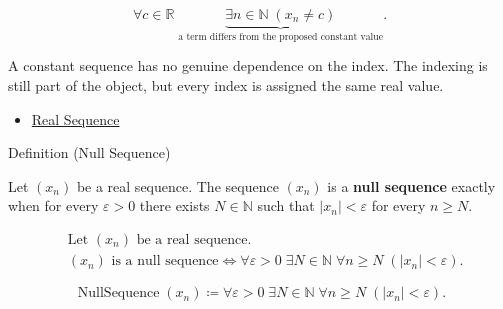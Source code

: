 \begin{remark*}
\[
\forall c \in \mathbb{R}\;
\underbrace{\exists n \in \mathbb{N}\;(x_n \neq c)}
_{\text{a term differs from the proposed constant value}}.
\]
\end{remark*}

\begin{remark*}[Interpretation]
A constant sequence has no genuine dependence on the index. The indexing is
still part of the object, but every index is assigned the same real value.
\end{remark*}

\begin{dependencies}
\begin{itemize}
  \item \hyperref[def:real-sequence]{Real Sequence}
\end{itemize}
\end{dependencies}


\begin{definitionbox}{Definition (Null Sequence)}
\begin{definition}
\label{def:null-sequence}
Let $(x_n)$ be a real sequence. The sequence $(x_n)$ is a
\textbf{null sequence} exactly when for every $\varepsilon > 0$ there exists
$N \in \mathbb{N}$ such that $|x_n| < \varepsilon$ for every $n \ge N$.
\end{definition}
\end{definitionbox}

\begin{remark*}
\[
\begin{aligned}
&\text{Let } (x_n) \text{ be a real sequence.}\\
&(x_n) \text{ is a null sequence}
\Longleftrightarrow
\forall \varepsilon > 0\;
\exists N \in \mathbb{N}\;
\forall n \ge N\;(|x_n| < \varepsilon).
\end{aligned}
\]
\end{remark*}

\begin{remark*}
\[
\operatorname{NullSequence}(x_n)
\coloneqq
\forall \varepsilon > 0\;
\exists N \in \mathbb{N}\;
\forall n \ge N\;(|x_n| < \varepsilon).
\]
\end{remark*}

